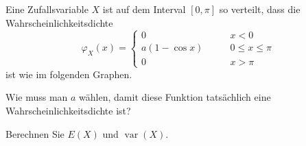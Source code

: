 Eine Zufallsvariable $X$ ist auf dem Interval $[0,\pi]$ so verteilt, dass die
Wahrscheinlichkeitsdichte
\[
\varphi_X(x)=\begin{cases}
0\qquad&x < 0\\
a(1-\cos x)\qquad&0\le x\le\pi\\
0\qquad&x>\pi
\end{cases}
\]
ist wie im folgenden Graphen.
\begin{center}
\end{center}
\begin{teilaufgaben}
\item
Wie muss man $a$ wählen, damit diese Funktion tatsächlich eine
Wahrscheinlichkeitsdichte ist?
\item
Berechnen Sie $E(X)$ und $\operatorname{var}(X)$.
\end{teilaufgaben}




